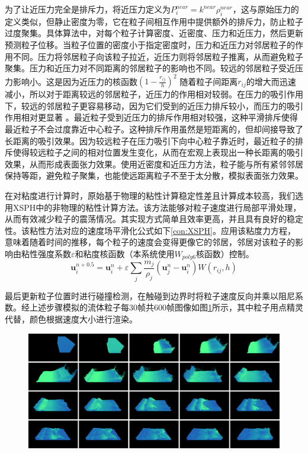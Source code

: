 为了让近压力完全是排斥力，将近压力定义为$P_i^{near}=k^{near}\rho_i^{near}$，这与原始压力的定义类似，但静止密度为零，它在粒子间相互作用中提供额外的排斥力，防止粒子过度聚集。具体算法中，对每个粒子计算密度、近密度、压力和近压力，然后更新预测粒子位移。当粒子位置的密度小于指定密度时，压力和近压力对邻居粒子的作用不同。压力将邻居粒子向该粒子拉近，近压力则将邻居粒子推离，从而避免粒子聚集。压力和近压力对不同距离的邻居粒子的影响也不同。较远的邻居粒子受近压力影响小。这是因为近压力的核函数$(1-\frac{r_{ij}}{h})^2$ 随着粒子间距离$r_{ij}$的增大而迅速减小，所以对于距离较远的邻居粒子，近压力的作用相对较弱。在压力的吸引作用下，较远的邻居粒子更容易移动，因为它们受到的近压力排斥较小，而压力的吸引作用相对更显著 。最近粒子受到近压力的排斥作用相对较强，这种平滑排斥使得最近粒子不会过度靠近中心粒子。这种排斥作用虽然是短距离的，但却间接导致了长距离的吸引效果。因为较远粒子在压力吸引下向中心粒子靠近时，最近粒子的排斥使得较远粒子之间的相对位置发生变化，从而在宏观上表现出一种长距离的吸引效果，从而形成表面张力效果。使用近密度和近压力方法，粒子能与所有紧邻邻居保持等距，避免粒子聚集，也能使远距离粒子不至于太分散，模拟表面张力效果。

在对粘度进行计算时，原始基于物理的粘性计算稳定性差且计算成本较高，我们选用XSPH\cite{schechter2012ghost}中的非物理的粘性计算方法。该方法能够对粒子速度进行局部平滑处理，从而有效减少粒子的震荡情况。其实现方式简单且效率更高，并且具有良好的稳定性。该粘性方法对应的速度场平滑化公式如下\eqref{con:XSPH}。应用该粘度力方程，意味着随着时间的推移，每个粒子的速度会变得更像它的邻居，邻居对该粒子的影响由粘性强度系数$\varepsilon$和粘度核函数（本系统使用$W_{poly6}$核函数）控制。
\begin{equation}
    \mathbf{u} _i^{n+0.5}=\mathbf{u} _i^n+\varepsilon \sum_j \frac{m_j}{\rho_j}(\mathbf{u}_j^n-\mathbf{u}_i^n)W(r_{ij},h)
    \label{con:XSPH}
\end{equation}

最后更新粒子位置时进行碰撞检测，在触碰到边界时将粒子速度反向并乘以阻尼系数。经上述步骤模拟的流体粒子每30帧共600帧图像如图\ref{fig:paritcleSim}所示，其中粒子用点精灵代替，颜色根据速度大小进行渲染。
\begin{figure}[ht]
 \centering
 \includegraphics[width=1.0\linewidth]{image/pic3.png}
 \label{fig:paritcleSim}
\end{figure}


